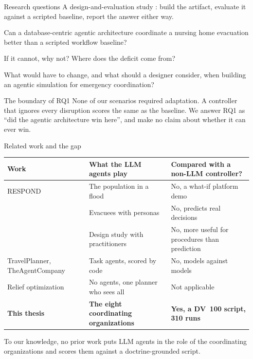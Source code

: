 \documentclass[10pt,aspectratio=169]{beamer}
\begin{document}
\begin{frame}{Research questions}
  A design-and-evaluation study \parencite{hevner2004}: build the artifact,
  evaluate it against a scripted baseline, report the answer either way.
  \medskip
  \begin{description}[RQ1]
    \item[RQ1] Can a database-centric agentic architecture coordinate a
      nursing home evacuation better than a scripted workflow baseline?
    \item[RQ2] If it cannot, why not? Where does the deficit come from?
    \item[RQ3] What would have to change, and what should a designer
      consider, when building an agentic simulation for emergency
      coordination?
  \end{description}
  \medskip
  \begin{alertblock}{The boundary of RQ1}
    None of our scenarios required adaptation. A controller that ignores
    every disruption scores the same as the baseline. We answer RQ1 as
    ``did the agentic architecture win here'', and make no claim about
    whether it can ever win.
  \end{alertblock}
\end{frame}

\begin{frame}{Related work and the gap}
  \footnotesize
  \begin{tabularx}{\textwidth}{@{}>{\raggedright\arraybackslash}p{5.4cm}>{\raggedright\arraybackslash}p{4.3cm}>{\raggedright\arraybackslash}X@{}}
    \toprule
    Work & What the LLM agents play & Compared with a non-LLM controller? \\
    \midrule
    RESPOND \parencite{sultimov2026} & The population in a flood & No, a what-if platform demo \\
    \textcite{lee2025} & Evacuees with personas & No, predicts real decisions \\
    \textcite{li2026} & Design study with practitioners & No, more useful for procedures than prediction \\
    TravelPlanner, TheAgentCompany \parencite{xie2024a,xu2025} & Task agents, scored by code & No, models against models \\
    Relief optimization \parencite{huang2012,yin2024} & No agents, one planner who sees all & Not applicable \\
    \midrule
    \textbf{This thesis} & \textbf{The eight coordinating organizations} & \textbf{Yes, a DV~100 script, 310 runs} \\
    \bottomrule
  \end{tabularx}
  \bigskip

  \small
  To our knowledge, no prior work puts LLM agents in the role of the
  coordinating organizations and scores them against a doctrine-grounded
  script.
\end{frame}
\end{document}
